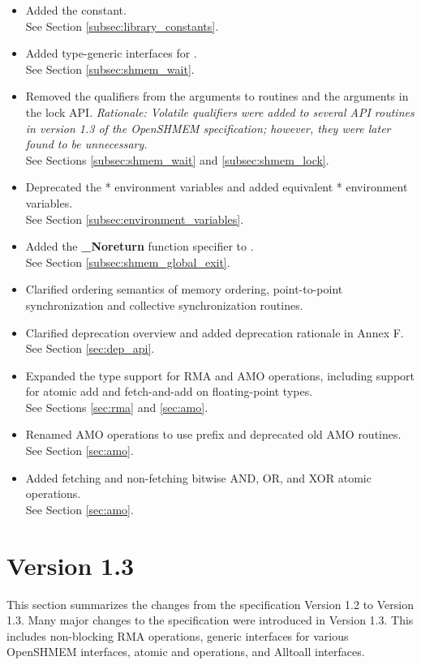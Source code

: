\begin{itemize}
%
\item Added the  constant.
\\See Section \ref{subsec:library_constants}.
%
\item Added type-generic interfaces for .
\\ See Section \ref{subsec:shmem_wait}.
%
\item Removed the  qualifiers from the  arguments to
 routines and the  arguments in the lock API.
\emph{Rationale: Volatile qualifiers were added to several API routines in
version 1.3 of the OpenSHMEM specification; however, they were later found
to be unnecessary.}
\\ See Sections \ref{subsec:shmem_wait} and \ref{subsec:shmem_lock}.
%
\item Deprecated the * environment variables and added equivalent
* environment variables.
\\ See Section \ref{subsec:environment_variables}.
%
\item Added the \Cstd[11] \textbf{\_Noreturn} function specifier to
      .
\\ See Section \ref{subsec:shmem_global_exit}.
%
\item Clarified ordering semantics of memory ordering, point-to-point synchronization and collective 
synchronization routines.
%
\item Clarified deprecation overview and added deprecation rationale in Annex F.
\\See Section \ref{sec:dep_api}.
%
\item Expanded the type support for RMA and AMO operations, including support
      for atomic add and fetch-and-add on floating-point types.
\\ See Sections \ref{sec:rma} and \ref{sec:amo}.
%
\item Renamed AMO operations to use  prefix and
      deprecated old AMO routines.
\\ See Section \ref{sec:amo}.
%
\item Added fetching and non-fetching bitwise AND, OR, and XOR atomic
      operations.
\\ See Section \ref{sec:amo}.

\end{itemize}

\section{Version 1.3}
This section summarizes the changes from the \openshmem specification Version
1.2 to Version 1.3. Many major changes to the specification were introduced in Version 1.3. This includes non-blocking RMA operations, 
generic interfaces for various OpenSHMEM interfaces, atomic  and  operations,  and Alltoall interfaces. 


